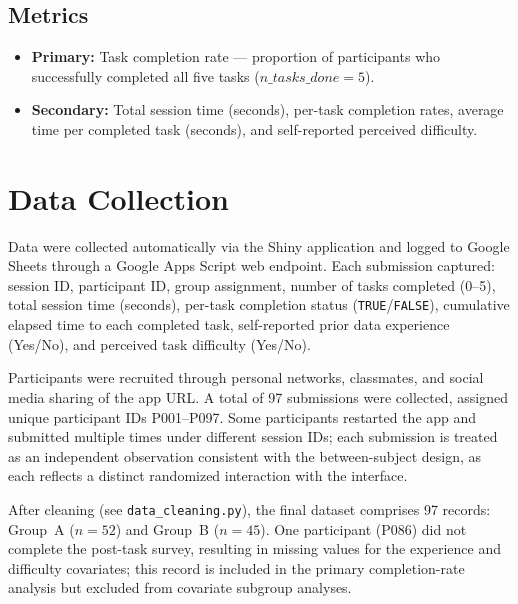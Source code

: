\documentclass[11pt, a4paper]{article}
\begin{document}
\subsection{Metrics}

\begin{itemize}[leftmargin=1.5em]
  \item \textbf{Primary:} Task completion rate --- proportion of participants who
        successfully completed all five tasks ($n\_tasks\_done = 5$).
  \item \textbf{Secondary:} Total session time (seconds), per-task completion
        rates, average time per completed task (seconds), and self-reported
        perceived difficulty.
\end{itemize}

\section{Data Collection}

Data were collected automatically via the Shiny application and logged to Google
Sheets through a Google Apps Script web endpoint. Each submission captured:
session ID, participant ID, group assignment, number of tasks completed (0--5),
total session time (seconds), per-task completion status (\texttt{TRUE}/\texttt{FALSE}),
cumulative elapsed time to each completed task, self-reported prior data experience
(Yes/No), and perceived task difficulty (Yes/No).

Participants were recruited through personal networks, classmates, and social media
sharing of the app URL. A total of 97 submissions were collected, assigned unique
participant IDs P001--P097. Some participants restarted the app and submitted multiple
times under different session IDs; each submission is treated as an independent
observation consistent with the between-subject design, as each reflects a distinct
randomized interaction with the interface.

After cleaning (see \texttt{data\_cleaning.py}), the final dataset comprises 97
records: Group~A ($n=52$) and Group~B ($n=45$). One participant (P086) did not
complete the post-task survey, resulting in missing values for the experience and
difficulty covariates; this record is included in the primary completion-rate
analysis but excluded from covariate subgroup analyses.
\end{document}
